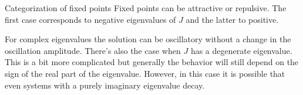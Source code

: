 \begin{frame}{Categorization of fixed points}
	Fixed points can be \alert{attractive} or \alert{repulsive}. The first case corresponds to negative eigenvalues of $ J $ and the latter to positive. 
	
	\pause
	For complex eigenvalues the solution can be oscillatory without a change in the oscillation amplitude. There's also the case when $ J $ has a degenerate eigenvalue. This is a bit more complicated but generally the behavior will still depend on the sign of the real part of the eigenvalue. However, in this case it is possible that even systems with a purely imaginary eigenvalue decay.
\end{frame}


